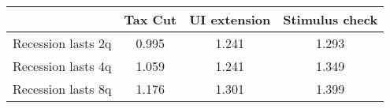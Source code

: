 \begin{tabular}{@{}lccc@{}}
\toprule
& Tax Cut    & UI extension    & Stimulus check    \\  \midrule
Recession lasts 2q &0.995  & 1.241  & 1.293     \\
Recession lasts 4q &1.059  & 1.241  & 1.349     \\
Recession lasts 8q &1.176  & 1.301  & 1.399     \\
\end{tabular}
